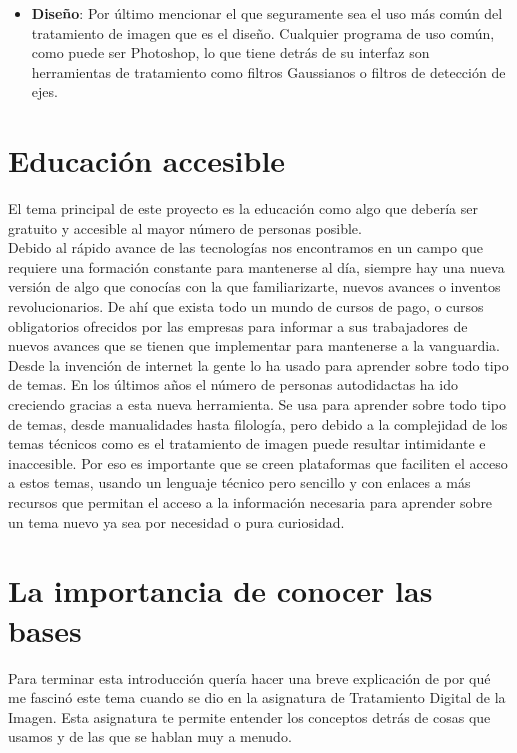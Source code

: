 \begin{itemize}
\item \textbf{Diseño}: Por último mencionar el que seguramente sea el uso más común del tratamiento de imagen que es el diseño. Cualquier programa de uso común, como puede ser Photoshop, lo que tiene detrás de su interfaz son herramientas de tratamiento como filtros Gaussianos o filtros de detección de ejes.\\

\end{itemize}

\section{Educación accesible}

El tema principal de este proyecto es la educación como algo que debería ser gratuito y accesible al mayor número de personas posible.\\

Debido al rápido avance de las tecnologías nos encontramos en un campo que requiere una formación constante para mantenerse al día, siempre hay una nueva versión de algo que conocías con la que familiarizarte, nuevos avances o inventos revolucionarios. De ahí que exista todo un mundo de cursos de pago, o cursos obligatorios ofrecidos por las empresas para informar a sus trabajadores de nuevos avances que se tienen que implementar para mantenerse a la vanguardia.\\

Desde la invención de internet la gente lo ha usado para aprender sobre todo tipo de temas. En los últimos años el número de personas autodidactas ha ido creciendo gracias a esta nueva herramienta. Se usa para aprender sobre todo tipo de temas, desde manualidades hasta filología, pero debido a la complejidad de los temas técnicos como es el tratamiento de imagen puede resultar intimidante e inaccesible. Por eso es importante que se creen plataformas que faciliten el acceso a estos temas, usando un lenguaje técnico pero sencillo y con enlaces a más recursos que permitan el acceso a la información necesaria para aprender sobre un tema nuevo ya sea por necesidad o pura curiosidad.\\

\section{La importancia de conocer las bases}

Para terminar esta introducción quería hacer una breve explicación de por qué me fascinó este tema cuando se dio en la asignatura de Tratamiento Digital de la Imagen. Esta asignatura te permite entender los conceptos detrás de cosas que usamos y de las que se hablan muy a menudo.\\

